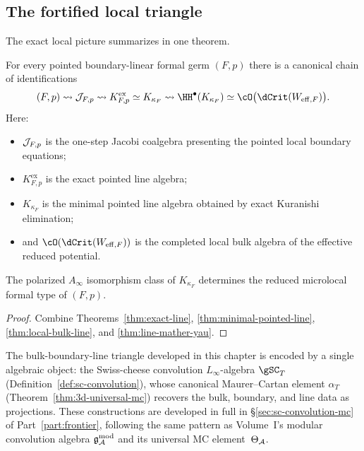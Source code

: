 \subsection{The fortified local triangle}

The exact local picture summarizes in one theorem.

\begin{theorem}\label{thm:fortified-local-triangle}
For every pointed boundary-linear formal germ $(F,p)$ there is a canonical chain of identifications
\[
(F,p)
\rightsquigarrow
\cJ_{F,p}
\rightsquigarrow
K^{\mathrm{ex}}_{F,p}
\simeq
K_{\kappa_F}
\rightsquigarrow
\HH^\bullet(K_{\kappa_F})
\simeq
\cO\bigl(\dCrit(W_{\eff,F})\bigr).
\]
Here:
\begin{itemize}[leftmargin=1.8em]
\item $\mathcal J_{F,p}$ is the one-step Jacobi coalgebra presenting the pointed local boundary equations;
\item $K^{\mathrm{ex}}_{F,p}$ is the exact pointed line algebra;
\item $K_{\kappa_F}$ is the minimal pointed line algebra obtained by exact Kuranishi elimination;
\item and $\cO(\dCrit(W_{\eff,F}))$ is the completed local bulk algebra of the effective reduced potential.
\end{itemize}
The polarized $A_\infty$ isomorphism class of $K_{\kappa_F}$ determines the reduced microlocal formal type of $(F,p)$.
\end{theorem}

\begin{proof}
Combine Theorems~\ref{thm:exact-line}, \ref{thm:minimal-pointed-line}, \ref{thm:local-bulk-line}, and \ref{thm:line-mather-yau}.
\end{proof}

\begin{remark}
\label{rem:forward-ref-sc-convolution}
The bulk-boundary-line triangle developed in this chapter is
encoded by a single algebraic object: the Swiss-cheese convolution
$L_\infty$-algebra $\gSC_T$
(Definition~\ref{def:sc-convolution}), whose canonical
Maurer--Cartan element $\alpha_T$
(Theorem~\ref{thm:3d-universal-mc}) recovers the bulk, boundary,
and line data as projections. These constructions are developed
in full in \S\ref{sec:sc-convolution-mc} of
Part~\ref{part:frontier}, following the same pattern as
Volume~I's modular convolution algebra $\mathfrak{g}^{\mathrm{mod}}_{\mathcal{A}}$ and its universal
MC element~$\Theta_{\mathcal{A}}$.
\end{remark}


